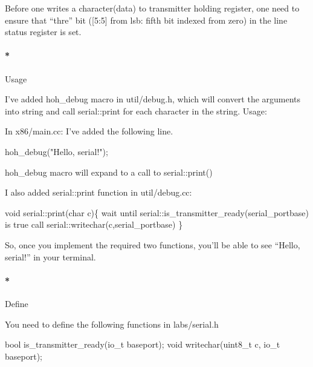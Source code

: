 \documentclass[]{article}
\newenvironment{Shaded}{}{}
\newcommand{\DataTypeTok}[1]{\textcolor[rgb]{0.50,0.00,0.00}{{#1}}}
\newcommand{\StringTok}[1]{\textcolor[rgb]{0.87,0.00,0.00}{{#1}}}
\newcommand{\NormalTok}[1]{{#1}}
\let\oldparagraph\paragraph
\renewcommand{\paragraph}[1]{\oldparagraph{#1}\mbox{}}
\begin{document}
Before one writes a character(data) to transmitter holding register, one
need to ensure that ``thre'' bit ({[}5:5{]} from lsb: fifth bit indexed
from zero) in the line status register is set.

\paragraph*{Usage}\label{usage-1}

I've added hoh\_debug macro in util/debug.h, which will convert the
arguments into string and call serial::print for each character in the
string. Usage:

In x86/main.cc: I've added the following line.

\begin{Shaded}
\begin{Highlighting}[]
    \NormalTok{hoh_debug(}\StringTok{"Hello, serial!"}\NormalTok{);}
\end{Highlighting}
\end{Shaded}

hoh\_debug macro will expand to a call to serial::print()

I also added serial::print function in util/debug.cc:

\begin{Shaded}
\begin{Highlighting}[]
    \DataTypeTok{void} \NormalTok{serial::print(}\DataTypeTok{char} \NormalTok{c)\{}
       \NormalTok{wait until serial::is_transmitter_ready(serial_portbase) is true}
       \NormalTok{call serial::writechar(c,serial_portbase)}
    \NormalTok{\}}
\end{Highlighting}
\end{Shaded}

So, once you implement the required two functions, you'll be able to see
``Hello, serial!'' in your terminal.

\paragraph*{Define}\label{define-1}

You need to define the following functions in labs/serial.h

\begin{Shaded}
\begin{Highlighting}[]
    \NormalTok{bool is_transmitter_ready(io_t baseport);}
    \DataTypeTok{void} \NormalTok{writechar(}\DataTypeTok{uint8_t} \NormalTok{c, io_t baseport);}
\end{Highlighting}
\end{Shaded}
\end{document}
